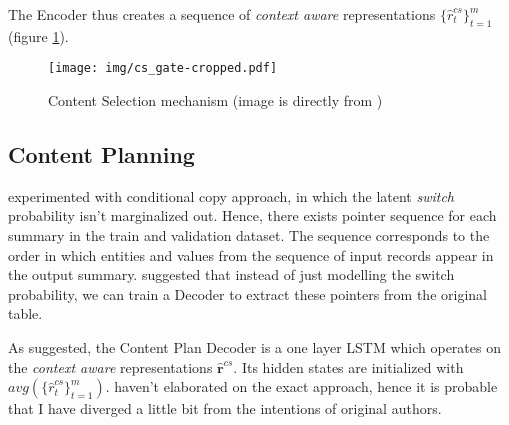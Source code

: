 The Encoder thus creates a sequence of \emph{context aware} representations $\{\hat{r}_t^{cs}\}_{t=1}^m$ (figure \ref{content_selection_pudupully}).

\begin{figure}[!h]
    \texttt{[image: img/cs\_gate-cropped.pdf]}
    \caption{Content Selection mechanism (image is directly from \citep{puduppully2019datatotext})} \label{content_selection_pudupully}
\end{figure}

\subsection{Content Planning} \label{subsection:content_planning}

\citep{wiseman2017} experimented with conditional copy approach, in which the latent \emph{switch} probability isn't marginalized out. Hence, there exists pointer sequence for each summary in the train and validation dataset. The sequence corresponds to the order in which entities and values from the sequence of input records appear in the output summary. \citep{puduppully2019datatotext} suggested that instead of just modelling the switch probability, we can train a Decoder to extract these pointers from the original table.

As suggested, the Content Plan Decoder is a one layer LSTM which operates on the \emph{context aware} representations $\hat{\boldsymbol{r}}^{cs}$. Its hidden states are initialized with $avg(\{\hat{r}_t^{cs}\}_{t=1}^m)$. \citep{puduppully2019datatotext} haven't elaborated on the exact approach, hence it is probable that I have diverged a little bit from the intentions of original authors.

